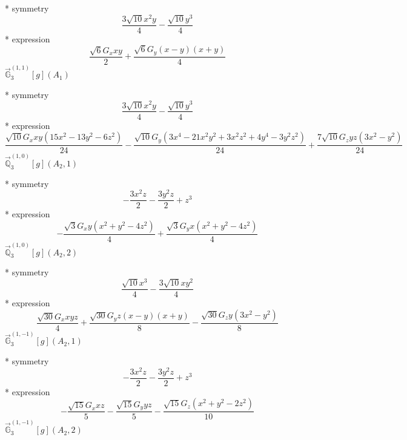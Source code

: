 \documentclass[fleqn,8pt]{jsarticle}
\begin{document}
\noindent\quad ** symmetry
\begin{dmath*}
\frac{3 \sqrt{10} x^{2} y}{4} - \frac{\sqrt{10} y^{3}}{4}
\end{dmath*}
\noindent\quad ** expression
\begin{dmath*}
\frac{\sqrt{6} G_{x} x y}{2} + \frac{\sqrt{6} G_{y} \left(x - y\right) \left(x + y\right)}{4}
\end{dmath*}
\noindent\quad $\vec{\mathbb{G}}_{3}^{(1,1)}[g](A_{1})$

\noindent\quad ** symmetry
\begin{dmath*}
\frac{3 \sqrt{10} x^{2} y}{4} - \frac{\sqrt{10} y^{3}}{4}
\end{dmath*}
\noindent\quad ** expression
\begin{dmath*}
\frac{\sqrt{10} G_{x} x y \left(15 x^{2} - 13 y^{2} - 6 z^{2}\right)}{24} - \frac{\sqrt{10} G_{y} \left(3 x^{4} - 21 x^{2} y^{2} + 3 x^{2} z^{2} + 4 y^{4} - 3 y^{2} z^{2}\right)}{24} + \frac{7 \sqrt{10} G_{z} y z \left(3 x^{2} - y^{2}\right)}{24}
\end{dmath*}
\noindent\quad $\vec{\mathbb{Q}}_{3}^{(1,0)}[g](A_{2},1)$

\noindent\quad ** symmetry
\begin{dmath*}
- \frac{3 x^{2} z}{2} - \frac{3 y^{2} z}{2} + z^{3}
\end{dmath*}
\noindent\quad ** expression
\begin{dmath*}
- \frac{\sqrt{3} G_{x} y \left(x^{2} + y^{2} - 4 z^{2}\right)}{4} + \frac{\sqrt{3} G_{y} x \left(x^{2} + y^{2} - 4 z^{2}\right)}{4}
\end{dmath*}
\noindent\quad $\vec{\mathbb{Q}}_{3}^{(1,0)}[g](A_{2},2)$

\noindent\quad ** symmetry
\begin{dmath*}
\frac{\sqrt{10} x^{3}}{4} - \frac{3 \sqrt{10} x y^{2}}{4}
\end{dmath*}
\noindent\quad ** expression
\begin{dmath*}
\frac{\sqrt{30} G_{x} x y z}{4} + \frac{\sqrt{30} G_{y} z \left(x - y\right) \left(x + y\right)}{8} - \frac{\sqrt{30} G_{z} y \left(3 x^{2} - y^{2}\right)}{8}
\end{dmath*}
\noindent\quad $\vec{\mathbb{G}}_{3}^{(1,-1)}[g](A_{2},1)$

\noindent\quad ** symmetry
\begin{dmath*}
- \frac{3 x^{2} z}{2} - \frac{3 y^{2} z}{2} + z^{3}
\end{dmath*}
\noindent\quad ** expression
\begin{dmath*}
- \frac{\sqrt{15} G_{x} x z}{5} - \frac{\sqrt{15} G_{y} y z}{5} - \frac{\sqrt{15} G_{z} \left(x^{2} + y^{2} - 2 z^{2}\right)}{10}
\end{dmath*}
\noindent\quad $\vec{\mathbb{G}}_{3}^{(1,-1)}[g](A_{2},2)$
\end{document}
